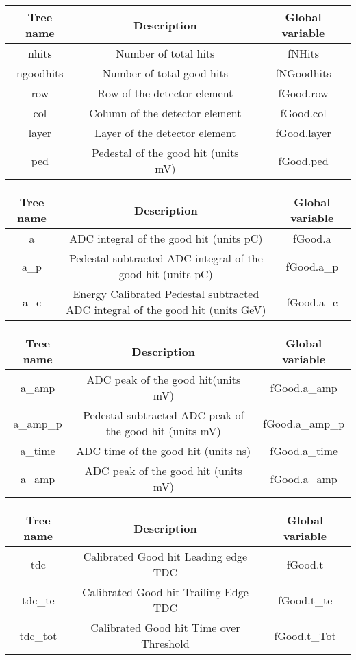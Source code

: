 \documentclass[11pt]{article}
\begin{document}
\begin{center}
\begin{tabular}{|c|c|c|}
	\hline 
Tree name	& Description &  Global variable\\ 
	\hline 
nhits	& Number of total hits & fNHits  \\ 
	\hline 
ngoodhits	& Number of total good hits & fNGoodhits \\ 
	\hline 
row 	& Row of the detector element  & fGood.row  \\ 
	\hline 
col 	& Column of the detector element  & fGood.col \\
	\hline 
layer	& Layer of the detector element  & fGood.layer \\ 
	\hline 
ped	& Pedestal of the good hit (units mV) & fGood.ped \\ 
	\hline 
\end{tabular} 
\end{center}

\begin{center}
\begin{tabular}{|c|c|c|}
	\hline 
Tree name	& Description &  Global variable\\ 
	\hline 
a	& ADC integral of the good hit (units pC)  &fGood.a  \\ 
	\hline 
a\_p	& Pedestal subtracted ADC integral of the good hit  (units pC) & fGood.a\_p \\ 
	\hline 
a\_c	& Energy Calibrated Pedestal subtracted ADC integral of the good hit (units GeV) & fGood.a\_c \\ 
\end{tabular} 
\end{center}

\begin{center}
\begin{tabular}{|c|c|c|}
	\hline 
Tree name	& Description &  Global variable\\ 
	\hline 
a\_amp	& ADC peak of the good hit(units mV)  &fGood.a\_amp  \\ 
\hline 
a\_amp\_p	& Pedestal subtracted ADC peak of the good hit (units mV) & fGood.a\_amp\_p \\ 
\hline 
a\_time	& ADC time of the good hit  (units ns)  &fGood.a\_time  \\ 
\hline 
a\_amp	& ADC peak of the good hit (units mV)  &fGood.a\_amp  \\ 
\hline 
\end{tabular} 
\end{center}


\begin{center}
\begin{tabular}{|c|c|c|}
	\hline 
	Tree name	& Description &  Global variable\\ 
	\hline 
	tdc 	& Calibrated Good hit Leading edge TDC  &fGood.t  \\ 
\hline 
	tdc\_te 	& Calibrated  Good hit Trailing Edge TDC  &fGood.t\_te  \\ 
\hline 
	tdc\_tot 	& Calibrated  Good hit Time over Threshold  &fGood.t\_Tot  \\ 
\hline 
\end{tabular} 
\end{center}
\end{document}
